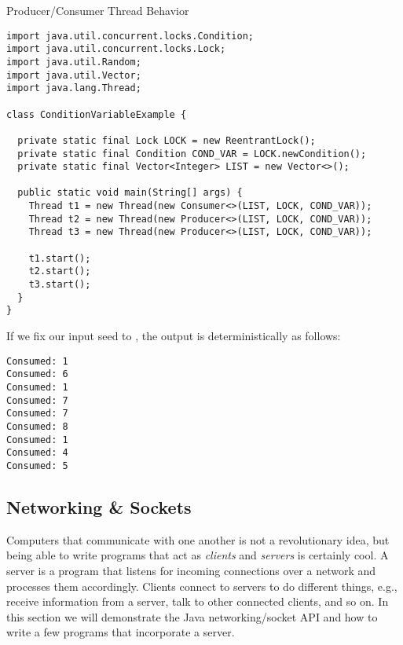\begin{cl}{Producer/Consumer Thread Behavior}
\begin{lstlisting}[language=MyJava]
import java.util.concurrent.locks.Condition;
import java.util.concurrent.locks.Lock;
import java.util.Random;
import java.util.Vector;
import java.lang.Thread;

class ConditionVariableExample {

  private static final Lock LOCK = new ReentrantLock();
  private static final Condition COND_VAR = LOCK.newCondition();
  private static final Vector<Integer> LIST = new Vector<>();

  public static void main(String[] args) {
    Thread t1 = new Thread(new Consumer<>(LIST, LOCK, COND_VAR));
    Thread t2 = new Thread(new Producer<>(LIST, LOCK, COND_VAR));
    Thread t3 = new Thread(new Producer<>(LIST, LOCK, COND_VAR));

    t1.start();
    t2.start();
    t3.start();
  }
}
\end{lstlisting}
\end{cl}

If we fix our input seed to , the output is deterministically as follows:

\par{
\begin{verbatim}
Consumed: 1
Consumed: 6
Consumed: 1
Consumed: 7
Consumed: 7
Consumed: 8
Consumed: 1
Consumed: 4
Consumed: 5
\end{verbatim}
}

\subsection*{Networking \& Sockets}

Computers that communicate with one another is not a revolutionary idea, but being able to write programs that act as \textit{clients} and \textit{servers} is certainly cool. A server is a program that listens for incoming connections over a network and processes them accordingly. Clients connect to servers to do different things, e.g., receive information from a server, talk to other connected clients, and so on. In this section we will demonstrate the Java networking/socket API and how to write a few programs that incorporate a server.

